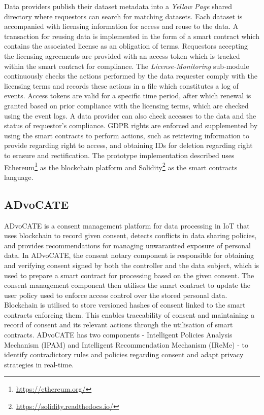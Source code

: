 Data providers publish their dataset metadata into a \textit{Yellow Page} shared directory where requestors can search for matching datasets. Each dataset is accompanied with licensing information for access and reuse to the data. A transaction for reusing data is implemented in the form of a smart contract which contains the associated license as an obligation of terms. Requestors accepting the licensing agreements are provided with an access token which is tracked within the smart contract for compliance. The \textit{License-Monitoring} sub-module continuously checks the actions performed by the data requester comply with the licensing terms and records these actions in a file which constitutes a log of events. Access tokens are valid for a specific time period, after which renewal is granted based on prior compliance with the licensing terms, which are checked using the event logs. A data provider can also check accesses to the data and the status of requestor's compliance. GDPR rights are enforced and supplemented by using the smart contracts to perform actions, such as retrieving information to provide regarding right to access, and obtaining IDs for deletion regarding right to erasure and rectification. The prototype implementation described uses Ethereum\footnote{\url{https://ethereum.org/}} as the blockchain platform and Solidity\footnote{\url{https://solidity.readthedocs.io/}} as the smart contracts language.

\subsection{ADvoCATE}
ADvoCATE \cite{rantos_advocate:_2019} is a consent management platform for data processing in IoT that uses blockchain to record given consent, detects conflicts in data sharing policies, and provides recommendations for managing unwarantted exposure of personal data. In ADvoCATE, the consent notary component is responsible for obtaining and verifying consent signed by both the controller and the data subject, which is used to prepare a smart contract for processing based on the given consent. The consent management component then utilises the smart contract to update the user policy used to enforce access control over the stored personal data. Blockchain is utilised to store versioned hashes of consent linked to the smart contracts enforcing them. This enables traceability of consent and maintaining a record of consent and its relevant actions through the utilisation of smart contracts.
ADvoCATE has two components - Intelligent Policies Analysis Mechanism (IPAM) and Intelligent Recommendation Mechanism (IReMe) - to identify contradictory rules and policies regarding consent and adapt privacy strategies in real-time. 

